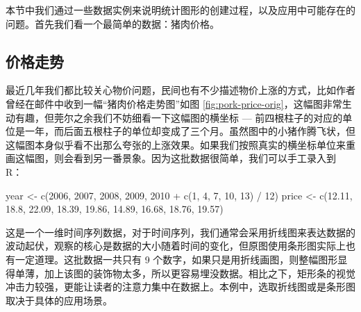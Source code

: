 \documentclass[
  b5paper,
  UTF8,twoside]{book}
\newenvironment{Shaded}{\begin{snugshade}}{\end{snugshade}}
\newcommand{\DecValTok}[1]{\textcolor[rgb]{0.00,0.00,0.81}{#1}}
\newcommand{\FloatTok}[1]{\textcolor[rgb]{0.00,0.00,0.81}{#1}}
\newcommand{\FunctionTok}[1]{\textcolor[rgb]{0.00,0.00,0.00}{#1}}
\newcommand{\NormalTok}[1]{#1}
\newcommand{\OtherTok}[1]{\textcolor[rgb]{0.56,0.35,0.01}{#1}}
\newcommand{\SpecialCharTok}[1]{\textcolor[rgb]{0.00,0.00,0.00}{#1}}
\begin{document}
本节中我们通过一些数据实例来说明统计图形的创建过程，以及应用中可能存在的问题。首先我们看一个最简单的数据：猪肉价格。

\hypertarget{ux4ef7ux683cux8d70ux52bf}{%
\subsection{价格走势}\label{ux4ef7ux683cux8d70ux52bf}}

最近几年我们都比较关心物价问题，民间也有不少描述物价上涨的方式，比如作者曾经在邮件中收到一幅``猪肉价格走势图''如图 \ref{fig:pork-price-orig}，这幅图非常生动有趣，但莞尔之余我们不妨细看一下这幅图的横坐标 --- 前四根柱子的对应的单位是一年，而后面五根柱子的单位却变成了三个月。虽然图中的小猪作腾飞状，但这幅图本身似乎看不出那么夸张的上涨效果。如果我们按照真实的横坐标单位来重画这幅图，则会看到另一番景象。因为这批数据很简单，我们可以手工录入到 R：

\begin{Shaded}
\begin{Highlighting}[]
\NormalTok{year }\OtherTok{\textless{}{-}} \FunctionTok{c}\NormalTok{(}\DecValTok{2006}\NormalTok{, }\DecValTok{2007}\NormalTok{, }\DecValTok{2008}\NormalTok{, }\DecValTok{2009}\NormalTok{, }\DecValTok{2010} \SpecialCharTok{+} \FunctionTok{c}\NormalTok{(}\DecValTok{1}\NormalTok{, }\DecValTok{4}\NormalTok{, }\DecValTok{7}\NormalTok{, }\DecValTok{10}\NormalTok{, }\DecValTok{13}\NormalTok{) }\SpecialCharTok{/} \DecValTok{12}\NormalTok{)}
\NormalTok{price }\OtherTok{\textless{}{-}} \FunctionTok{c}\NormalTok{(}\FloatTok{12.11}\NormalTok{, }\FloatTok{18.8}\NormalTok{, }\FloatTok{22.09}\NormalTok{, }\FloatTok{18.39}\NormalTok{, }\FloatTok{19.86}\NormalTok{, }\FloatTok{14.89}\NormalTok{, }\FloatTok{16.68}\NormalTok{, }\FloatTok{18.76}\NormalTok{, }\FloatTok{19.57}\NormalTok{)}
\end{Highlighting}
\end{Shaded}

这是一个一维时间序列数据，对于时间序列，我们通常会采用折线图来表达数据的波动起伏，观察的核心是数据的大小随着时间的变化，但原图使用条形图实际上也有一定道理。这批数据一共只有 9 个数字，如果只是用折线画图，则整幅图形显得单薄，加上该图的装饰物太多，所以更容易埋没数据。相比之下，矩形条的视觉冲击力较强，更能让读者的注意力集中在数据上。本例中，选取折线图或是条形图取决于具体的应用场景。
\end{document}
